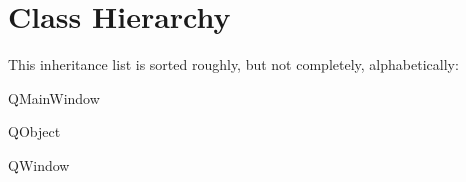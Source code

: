 \section{Class Hierarchy}
This inheritance list is sorted roughly, but not completely, alphabetically\+:\begin{DoxyCompactList}
\item Q\+Main\+Window\begin{DoxyCompactList}
\item {}
\end{DoxyCompactList}
\item Q\+Object\begin{DoxyCompactList}
\item {}
\item {}
\item {}
\item {}
\item {}
\end{DoxyCompactList}
\item Q\+Window\begin{DoxyCompactList}
\item {}
\end{DoxyCompactList}
\end{DoxyCompactList}
